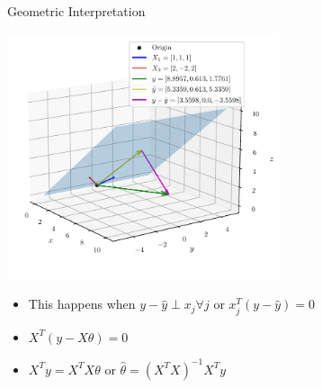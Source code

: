 \documentclass{beamer}
\begin{document}
\begin{frame}{Geometric Interpretation}	

    \includegraphics[width=0.6\textwidth]{../figures/linear-regression/geometric-4.pdf}

    


\begin{itemize}[<+->]
\item This happens when $y-\hat{y}\perp x_j \forall j$ or $x_j^T(y-\hat{y})=0$
\item $X^T(y-X\theta)=0$
\item $X^Ty = X^TX\theta$ or $\hat{\theta} =(X^TX)^{-1}X^Ty$ 
\end{itemize}

\end{frame}
\end{document}
